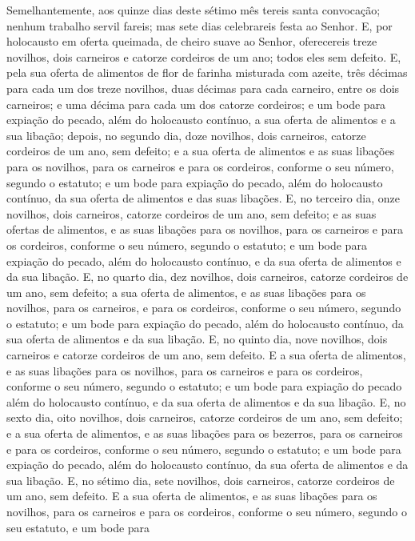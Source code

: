 Semelhantemente, aos quinze dias deste sétimo mês tereis santa
convocação; nenhum trabalho servil fareis; mas sete dias celebrareis
festa ao Senhor. E, por holocausto em oferta queimada, de
cheiro suave ao Senhor, oferecereis treze novilhos, dois carneiros e
catorze cordeiros de um ano; todos eles sem defeito. E, pela
sua oferta de alimentos de flor de farinha misturada com azeite,
três décimas para cada um dos treze novilhos, duas décimas para cada
carneiro, entre os dois carneiros; e uma décima para cada um
dos catorze cordeiros; e um bode para expiação do pecado,
além do holocausto contínuo, a sua oferta de alimentos e a sua
libação; depois, no segundo dia, doze novilhos, dois
carneiros, catorze cordeiros de um ano, sem defeito; e a sua
oferta de alimentos e as suas libações para os novilhos, para os
carneiros e para os cordeiros, conforme o seu número, segundo o
estatuto; e um bode para expiação do pecado, além do
holocausto contínuo, da sua oferta de alimentos e das suas libações.
E, no terceiro dia, onze novilhos, dois carneiros, catorze
cordeiros de um ano, sem defeito; e as suas ofertas de
alimentos, e as suas libações para os novilhos, para os carneiros e
para os cordeiros, conforme o seu número, segundo o estatuto;
e um bode para expiação do pecado, além do holocausto
contínuo, e da sua oferta de alimentos e da sua libação. E,
no quarto dia, dez novilhos, dois carneiros, catorze cordeiros de um
ano, sem defeito; a sua oferta de alimentos, e as suas
libações para os novilhos, para os carneiros, e para os cordeiros,
conforme o seu número, segundo o estatuto; e um bode para
expiação do pecado, além do holocausto contínuo, da sua oferta de
alimentos e da sua libação. E, no quinto dia, nove novilhos,
dois carneiros e catorze cordeiros de um ano, sem defeito. E
a sua oferta de alimentos, e as suas libações para os novilhos, para
os carneiros e para os cordeiros, conforme o seu número, segundo o
estatuto; e um bode para expiação do pecado além do
holocausto contínuo, e da sua oferta de alimentos e da sua libação.
E, no sexto dia, oito novilhos, dois carneiros, catorze
cordeiros de um ano, sem defeito; e a sua oferta de
alimentos, e as suas libações para os bezerros, para os carneiros e
para os cordeiros, conforme o seu número, segundo o estatuto;
e um bode para expiação do pecado, além do holocausto
contínuo, da sua oferta de alimentos e da sua libação. E, no
sétimo dia, sete novilhos, dois carneiros, catorze cordeiros de um
ano, sem defeito. E a sua oferta de alimentos, e as suas
libações para os novilhos, para os carneiros e para os cordeiros,
conforme o seu número, segundo o seu estatuto, e um bode para
